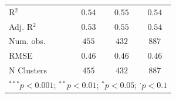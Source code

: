 \begin{table}[!htpb]
\begin{center}
{\begin{tabular}{l c c c}
\hline
R$^2$                                                          & $0.54$       & $0.55$       & $0.54$       \\
Adj. R$^2$                                                     & $0.53$       & $0.55$       & $0.54$       \\
Num. obs.                                                      & $455$        & $432$        & $887$        \\
RMSE                                                           & $0.46$       & $0.46$       & $0.46$       \\
N Clusters                                                     & $455$        & $432$        & $887$        \\
\hline
\multicolumn{4}{l}{\scriptsize{$^{***}p<0.001$; $^{**}p<0.01$; $^{*}p<0.05$; $^{\cdot}p<0.1$}}
\end{tabular}
}
\label{tab:tripleinteraction-mainspecification-censorship-weighted-clusteredses-ld}
\end{center}
\end{table}
